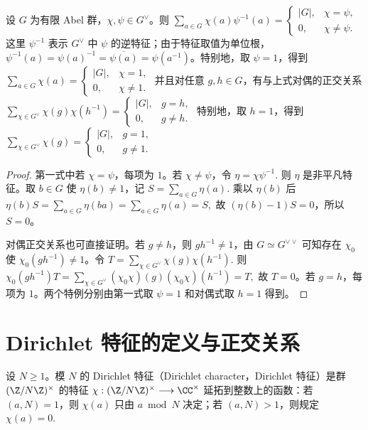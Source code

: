 \begin{theorem}[特征的正交关系]
设 $G$ 为有限 Abel 群，$\chi,\psi\in G^\vee$。则
\(
  \sum_{a\in G}\chi(a)\psi^{-1}(a)
  =
  \begin{cases}
    |G|,& \chi=\psi,\\
    0,& \chi\ne\psi.
  \end{cases}
\)
这里 \(\psi^{-1}\) 表示 \(G^\vee\) 中 \(\psi\) 的逆特征；由于特征取值为单位根，\(\psi^{-1}(a)=\psi(a)^{-1}=\overline{\psi(a)}=\psi(a^{-1})\)。特别地，取 \(\psi=1\)，得到
\(
  \sum_{a\in G}\chi(a)
  =
  \begin{cases}
    |G|,& \chi=1,\\
    0,& \chi\ne1.
  \end{cases}
\)
并且对任意 \(g,h\in G\)，有与上式对偶的正交关系
\(
  \sum_{\chi\in G^\vee}\chi(g)\chi(h^{-1})
  =
  \begin{cases}
    |G|,& g=h,\\
    0,& g\ne h.
  \end{cases}
\)
特别地，取 \(h=1\)，得到
\(
  \sum_{\chi\in G^\vee}\chi(g)
  =
  \begin{cases}
    |G|,& g=1,\\
    0,& g\ne1.
  \end{cases}
\)
\end{theorem}

\begin{proof}
第一式中若 $\chi=\psi$，每项为 $1$。若 $\chi\ne\psi$，令
\(
  \eta=\chi\psi^{-1}.
\)
则 $\eta$ 是非平凡特征。取 $b\in G$ 使 $\eta(b)\ne1$，记
\(
  S=\sum_{a\in G}\eta(a).
\)
乘以 $\eta(b)$ 后
\(
  \eta(b)S=\sum_{a\in G}\eta(ba)=\sum_{a\in G}\eta(a)=S,
\)
故 $(\eta(b)-1)S=0$，所以 $S=0$。

对偶正交关系也可直接证明。若 \(g\ne h\)，则 \(gh^{-1}\ne1\)，由
$G\simeq G^{\vee\vee}$ 可知存在 $\chi_0$ 使 $\chi_0(gh^{-1})\ne1$。令
\(
  T=\sum_{\chi\in G^\vee}\chi(g)\chi(h^{-1}).
\)
则
\(
  \chi_0(gh^{-1})T
  =
  \sum_{\chi\in G^\vee}(\chi_0\chi)(g)(\chi_0\chi)(h^{-1})
  =
  T,
\)
故 $T=0$。若 \(g=h\)，每项为 \(1\)。两个特例分别由第一式取 \(\psi=1\) 和对偶式取 \(h=1\) 得到。
\end{proof}

\section{Dirichlet 特征的定义与正交关系}

\begin{definition}
设 $N\ge1$。模 $N$ 的 Dirichlet 特征（Dirichlet character，Dirichlet 特征）是群
\(
  \U N
\)
的特征
\(
  \chi:\U N\longrightarrow \C^\times
\)
延拓到整数上的函数：若 $(a,N)=1$，则 $\chi(a)$ 只由 $a\bmod N$ 决定；若 $(a,N)>1$，则规定
\(
  \chi(a)=0.
\)
\end{definition}

